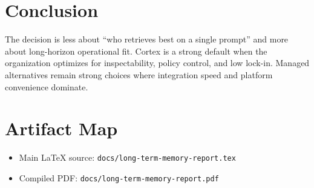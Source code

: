 \documentclass[10pt,twocolumn]{article}
\begin{document}
\section{Conclusion}
The decision is less about ``who retrieves best on a single prompt'' and more about long-horizon operational fit. Cortex is a strong default when the organization optimizes for inspectability, policy control, and low lock-in. Managed alternatives remain strong choices where integration speed and platform convenience dominate.

\appendix
\section*{Artifact Map}
\small
\begin{itemize}
  \item Main LaTeX source: \texttt{docs/long-term-memory-report.tex}
  \item Compiled PDF: \texttt{docs/long-term-memory-report.pdf}
\end{itemize}
\end{document}
